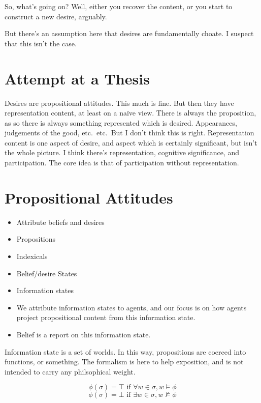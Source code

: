 \documentclass[10pt]{article}
\begin{document}
So, what's going on?
Well, either you recover the content, or you start to construct a new desire, arguably.

But there's an assumption here that desires are fundamentally choate.
I suspect that this isn't the case.






\section{Attempt at a Thesis}
\label{sec:attempt-at-thesis}

Desires are propositional attitudes.
This much is fine.
But then they have representation content, at least on a na\"{i}ve view.
There is always the proposition, as so there is always something represented which is desired.
Appearances, judgements of the good, etc.\ etc.\
But I don't think this is right.
Representation content is one aspect of desire, and aspect which is certainly significant, but isn't the whole picture.
I think there's representation, cognitive significance, and participation.
The core idea is that of participation without representation.



\section{Propositional Attitudes}
\label{sec:prop-attit}


\begin{itemize}
\item Attribute beliefs and desires
\item Propositions
\item Indexicals
\item Belief/desire States
\item Information states
\item We attribute information states to agents, and our focus is on how agents project propositional content from this information state.
\item Belief is a report on this information state.
\end{itemize}

Information state is a set of worlds.
In this way, propositions are coerced into functions, or something.
The formalism is here to help exposition, and is not intended to carry any philsophical weight.

\[\phi(\sigma) = \top \text{ if } \forall w \in \sigma, w \vDash \phi\]
\[\phi(\sigma) = \bot \text{ if } \exists w \in \sigma, w \nvDash \phi\]
\end{document}
